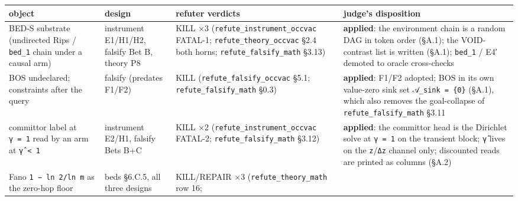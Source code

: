 \documentclass[11pt,a4paper]{article}
\newcounter{none}                 %
\theoremstyle{plain}
\theoremstyle{definition}
\theoremstyle{remark}
\begin{document}
{\def\LTcaptype{none} %
\begin{longtable}[]{@{}
  >{\raggedright\arraybackslash}p{}
  >{\raggedright\arraybackslash}p{}
  >{\raggedright\arraybackslash}p{}
  >{\raggedright\arraybackslash}p{}@{}}
\toprule\noalign{}
\begin{minipage}[b]{\linewidth}\raggedright
object
\end{minipage} & \begin{minipage}[b]{\linewidth}\raggedright
design
\end{minipage} & \begin{minipage}[b]{\linewidth}\raggedright
refuter verdicts
\end{minipage} & \begin{minipage}[b]{\linewidth}\raggedright
judge's disposition
\end{minipage} \\
\midrule\noalign{}
\endhead
\bottomrule\noalign{}
\endlastfoot
BED-S substrate (undirected Rips / \texttt{bed\_1} chain under a causal
arm) & instrument E1/H1/H2, falsify Bet B, theory P8 & KILL ×3
(\texttt{refute\_instrument\_occvac} FATAL-1;
\texttt{refute\_theory\_occvac} §2.4 both horns;
\texttt{refute\_falsify\_math} §3.13) & \textbf{applied}: the
environment chain is a random DAG in token order (§A.1); the
VOID-contrast list is written (§A.1); \texttt{bed\_1} / E4′ demoted to
oracle cross-checks \\
BOS undeclared; constraints after the query & falsify (predates F1/F2) &
KILL (\texttt{refute\_falsify\_occvac} §5.1;
\texttt{refute\_falsify\_math} §0.3) & \textbf{applied}: F1/F2 adopted;
BOS in its own value-zero sink set \texttt{𝒜\_sink\ =\ \{0\}} (§A.1),
which also removes the goal-collapse of \texttt{refute\_falsify\_math}
§3.11 \\
committor label at \texttt{γ\ =\ 1} read by an arm at
\texttt{γ̂\ \textless{}\ 1} & instrument E2/H1, falsify Bets B+C & KILL
×2 (\texttt{refute\_instrument\_occvac} FATAL-2;
\texttt{refute\_falsify\_math} §3.12) & \textbf{applied}: the committor
head is the Dirichlet solve at \texttt{γ\ =\ 1} on the transient block;
\texttt{γ̂} lives on the \texttt{z}/\texttt{Δz} channel only; discounted
reads are printed as columns (§A.2) \\
Fano \texttt{1\ −\ ln\ 2/ln\ m} as the zero-hop floor & beds §6.C.5, all
three designs & KILL/REPAIR ×3 (\texttt{refute\_theory\_math} row 16;

\end{longtable}}
\end{document}
